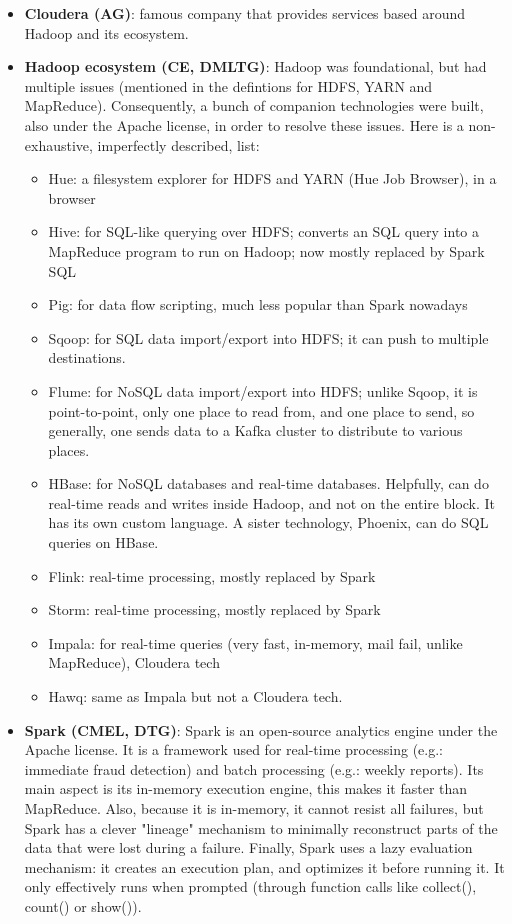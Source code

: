 \documentclass{article}
\begin{document}
\begin{itemize}
    \item \textbf{Cloudera (AG)}: famous company that provides services based around Hadoop and its ecosystem.

    \item \textbf{Hadoop ecosystem (CE, DMLTG)}: Hadoop was foundational, but had multiple issues (mentioned in the defintions for HDFS, YARN and MapReduce). Consequently, a bunch of companion technologies were built, also under the Apache license, in order to resolve these issues. Here is a non-exhaustive, imperfectly described, list:
    \begin{itemize}
		\item Hue: a filesystem explorer for HDFS and YARN (Hue Job Browser), in a browser
		\item Hive: for SQL-like querying over HDFS; converts an SQL query into a MapReduce program to run on Hadoop; now mostly replaced by Spark SQL
		\item Pig: for data flow scripting, much less popular than Spark nowadays
		\item Sqoop: for SQL data import/export into HDFS; it can push to multiple destinations.
		\item Flume: for NoSQL data import/export into HDFS; unlike Sqoop, it is point-to-point, only one place to read from, and one place to send, so generally, one sends data to a Kafka cluster to distribute to various places.
		\item HBase: for NoSQL databases and real-time databases. Helpfully, can do real-time reads and writes inside Hadoop, and not on the entire block. It has its own custom language. A sister technology, Phoenix, can do SQL queries on HBase.
		\item Flink: real-time processing, mostly replaced by Spark
		\item Storm: real-time processing, mostly replaced by Spark
		\item Impala: for real-time queries (very fast, in-memory, mail fail, unlike MapReduce), Cloudera tech
		\item Hawq: same as Impala but not a Cloudera tech.
    \end{itemize}


    \item \textbf{Spark (CMEL, DTG)}: Spark is an open-source analytics engine under the Apache license. It is a framework used for real-time processing (e.g.: immediate fraud detection) and batch processing (e.g.: weekly reports). Its main aspect is its in-memory execution engine, this makes it faster than MapReduce. Also, because it is in-memory, it cannot resist all failures, but Spark has a clever "lineage" mechanism to minimally reconstruct parts of the data that were lost during a failure. Finally, Spark uses a lazy evaluation mechanism: it creates an execution plan, and optimizes it before running it. It only effectively runs when prompted (through function calls like collect(), count() or show()).


\end{itemize}
\end{document}
